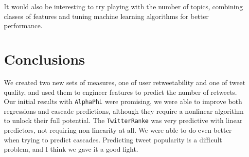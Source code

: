 It would also be interesting to try playing with the number of topics, combining classes of features and tuning machine learning algorithms for better performance.  


\section{Conclusions}

We created two new sets of measures, one of user retweetability and one of tweet quality, and used them to engineer features to predict the number of retweets.
Our initial results with \texttt{AlphaPhi} were promising, we were able to improve both regressions and cascade predictions, although they require a nonlinear algorithm to unlock their full potential.  
The \texttt{TwitterRanke} was very predictive with linear predictors, not requiring non linearity at all.  
We were able to do even better when trying to predict cascades.  
Predicting tweet popularity is a difficult problem, and I think we gave it a good fight.  
